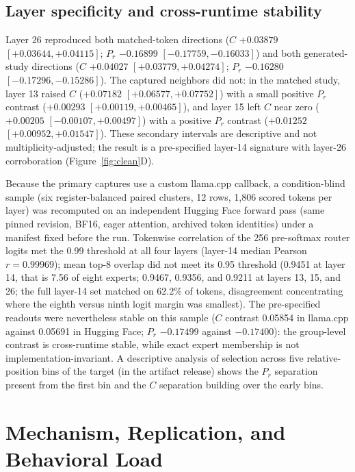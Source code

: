 \documentclass[10pt,a4paper,twocolumn]{article}
\begin{document}
\subsection{Layer specificity and cross-runtime stability}

Layer 26 reproduced both matched-token directions (\(C\) \(+0.03879\)
\([+0.03644,+0.04115]\); \(P_r\) \(-0.16899\) \([-0.17759,-0.16033]\)) and
both generated-study directions (\(C\) \(+0.04027\) \([+0.03779,+0.04274]\);
\(P_r\) \(-0.16280\) \([-0.17296,-0.15286]\)). The captured neighbors did not:
in the matched study, layer 13 raised \(C\) (\(+0.07182\)
\([+0.06577,+0.07752]\)) with a small positive \(P_r\) contrast (\(+0.00293\)
\([+0.00119,+0.00465]\)), and layer 15 left \(C\) near zero (\(+0.00205\)
\([-0.00107,+0.00497]\)) with a positive \(P_r\) contrast (\(+0.01252\)
\([+0.00952,+0.01547]\)). These secondary intervals are descriptive and not
multiplicity-adjusted; the result is a pre-specified layer-14 signature with
layer-26 corroboration (Figure~\ref{fig:clean}D).

Because the primary captures use a custom llama.cpp callback, a
condition-blind sample (six register-balanced paired clusters, 12 rows, 1,806
scored tokens per layer) was recomputed on an independent Hugging Face forward
pass (same pinned revision, BF16, eager attention, archived token identities)
under a manifest fixed before the run. Tokenwise correlation of the 256
pre-softmax router logits met the 0.99 threshold at all four layers (layer-14
median Pearson \(r=0.99969\)); mean top-8 overlap did not meet its 0.95
threshold (0.9451 at layer 14, that is 7.56 of eight experts; 0.9467, 0.9356,
and 0.9211 at layers 13, 15, and 26; the full layer-14 set matched on 62.2\%
of tokens, disagreement concentrating where the eighth
versus ninth logit margin was smallest). The pre-specified readouts were
nevertheless stable on this sample (\(C\) contrast 0.05854 in llama.cpp
against 0.05691 in Hugging Face; \(P_r\) \(-0.17499\) against \(-0.17400\)):
the group-level contrast is cross-runtime stable, while exact expert
membership is not implementation-invariant. A descriptive analysis of
selection across five relative-position bins of the target (in the artifact
release) shows the \(P_r\) separation present from the first bin and the
\(C\) separation building over the early bins.

\section{Mechanism, Replication, and Behavioral Load}\label{sec:mechanism}
\end{document}
